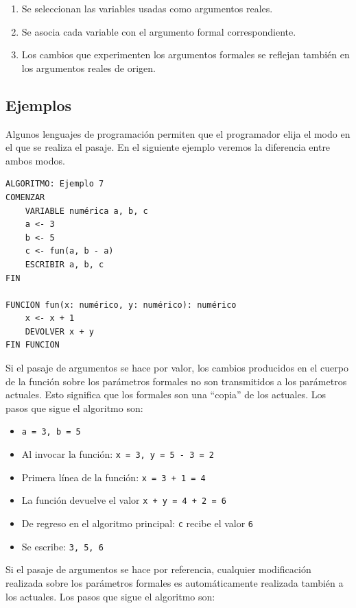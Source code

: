 \documentclass[]{book}
\providecommand{\tightlist}{%
  \setlength{\itemsep}{0pt}\setlength{\parskip}{0pt}}
\begin{document}
\begin{enumerate}
\def\labelenumi{\arabic{enumi}.}
\tightlist
\item
  Se seleccionan las variables usadas como argumentos reales.
\item
  Se asocia cada variable con el argumento formal correspondiente.
\item
  Los cambios que experimenten los argumentos formales se reflejan
  también en los argumentos reales de origen.
\end{enumerate}

\subsection{Ejemplos}\label{ejemplos}

Algunos lenguajes de programación permiten que el programador elija el
modo en el que se realiza el pasaje. En el siguiente ejemplo veremos la
diferencia entre ambos modos.

\begin{verbatim}
ALGORITMO: Ejemplo 7
COMENZAR
    VARIABLE numérica a, b, c
    a <- 3
    b <- 5
    c <- fun(a, b - a)
    ESCRIBIR a, b, c
FIN

FUNCION fun(x: numérico, y: numérico): numérico
    x <- x + 1
    DEVOLVER x + y
FIN FUNCION
\end{verbatim}

Si el pasaje de argumentos se hace por valor, los cambios producidos en
el cuerpo de la función sobre los parámetros formales no son
transmitidos a los parámetros actuales. Esto significa que los formales
son una ``copia'' de los actuales. Los pasos que sigue el algoritmo son:

\begin{itemize}
\tightlist
\item
  \texttt{a\ =\ 3,\ b\ =\ 5}
\item
  Al invocar la función: \texttt{x\ =\ 3,\ y\ =\ 5\ -\ 3\ =\ 2}
\item
  Primera línea de la función: \texttt{x\ =\ 3\ +\ 1\ =\ 4}
\item
  La función devuelve el valor \texttt{x\ +\ y\ =\ 4\ +\ 2\ =\ 6}
\item
  De regreso en el algoritmo principal: \texttt{c} recibe el valor
  \texttt{6}
\item
  Se escribe: \texttt{3,\ 5,\ 6}
\end{itemize}

Si el pasaje de argumentos se hace por referencia, cualquier
modificación realizada sobre los parámetros formales es automáticamente
realizada también a los actuales. Los pasos que sigue el algoritmo son:
\end{document}
